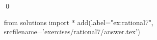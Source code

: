
\begin{ex} 
  \label{ex:rational7}
  
  \qed
\end{ex} 
\begin{python0}
from solutions import *
add(label="ex:rational7",
    srcfilename='exercises/rational7/answer.tex') 
\end{python0}
